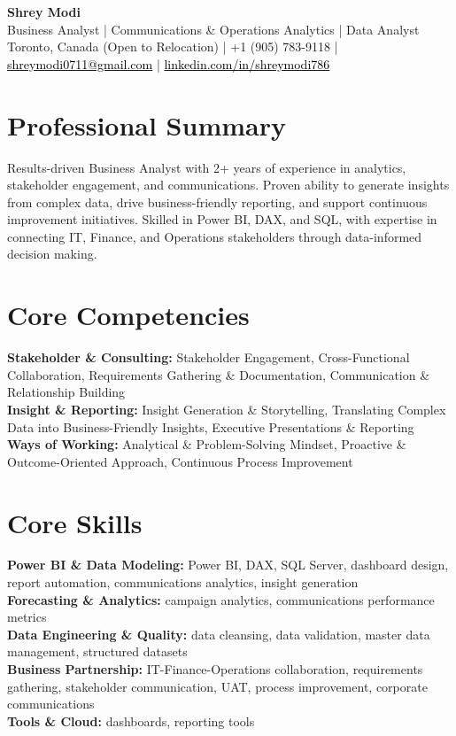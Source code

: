 \documentclass[10.5pt,letterpaper]{article}
\begin{document}
\begin{center}
  {\Huge \bfseries \color{accent} Shrey Modi}\\[0.3em]
  {\normalsize Business Analyst | Communications \& Operations Analytics | Data Analyst}\\[0.1em]
  {\small
    Toronto, Canada (Open to Relocation)
 | +1 (905) 783-9118 | \href{mailto:shreymodi0711@gmail.com}{\textcolor{black}{shreymodi0711@gmail.com}} | \href{https://linkedin.com/in/shreymodi786}{\textcolor{black}{linkedin.com/in/shreymodi786}}  }
\end{center}
\vspace{-12pt}

\section{Professional Summary}
\noindent Results-driven Business Analyst with 2+ years of experience in analytics, stakeholder engagement, and communications. Proven ability to generate insights from complex data, drive business-friendly reporting, and support continuous improvement initiatives. Skilled in Power BI, DAX, and SQL, with expertise in connecting IT, Finance, and Operations stakeholders through data-informed decision making.

\section{Core Competencies}
\noindent
\textbf{Stakeholder \& Consulting:} Stakeholder Engagement, Cross-Functional Collaboration, Requirements Gathering \& Documentation, Communication \& Relationship Building\\\textbf{Insight \& Reporting:} Insight Generation \& Storytelling, Translating Complex Data into Business-Friendly Insights, Executive Presentations \& Reporting\\\textbf{Ways of Working:} Analytical \& Problem-Solving Mindset, Proactive \& Outcome-Oriented Approach, Continuous Process Improvement
\section{Core Skills}
\noindent
\textbf{Power BI \& Data Modeling:} Power BI, DAX, SQL Server, dashboard design, report automation, communications analytics, insight generation\\\textbf{Forecasting \& Analytics:} campaign analytics, communications performance metrics\\\textbf{Data Engineering \& Quality:} data cleansing, data validation, master data management, structured datasets\\\textbf{Business Partnership:} IT-Finance-Operations collaboration, requirements gathering, stakeholder communication, UAT, process improvement, corporate communications\\\textbf{Tools \& Cloud:} dashboards, reporting tools
\end{document}
